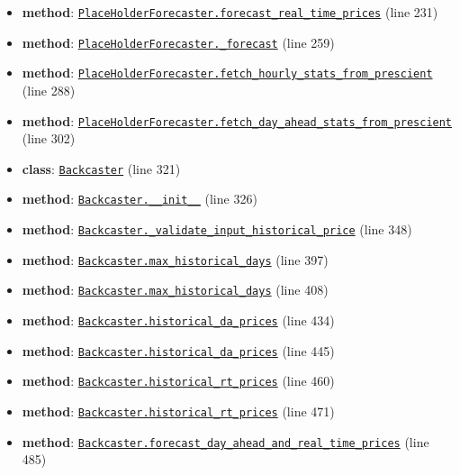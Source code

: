 \documentclass[11pt]{report}
\begin{document}
\begin{itemize}[leftmargin=*]
  \item \textbf{method}: \hyperref[def:forecaster.py:PlaceHolderForecaster.forecast_real_time_prices:L231]{\texttt{PlaceHolderForecaster.forecast\_real\_time\_prices}} (line 231)
  \item \textbf{method}: \hyperref[def:forecaster.py:PlaceHolderForecaster._forecast:L259]{\texttt{PlaceHolderForecaster.\_forecast}} (line 259)
  \item \textbf{method}: \hyperref[def:forecaster.py:PlaceHolderForecaster.fetch_hourly_stats_from_prescient:L288]{\texttt{PlaceHolderForecaster.fetch\_hourly\_stats\_from\_prescient}} (line 288)
  \item \textbf{method}: \hyperref[def:forecaster.py:PlaceHolderForecaster.fetch_day_ahead_stats_from_prescient:L302]{\texttt{PlaceHolderForecaster.fetch\_day\_ahead\_stats\_from\_prescient}} (line 302)
  \item \textbf{class}: \hyperref[def:forecaster.py:Backcaster:L321]{\texttt{Backcaster}} (line 321)
  \item \textbf{method}: \hyperref[def:forecaster.py:Backcaster.__init__:L326]{\texttt{Backcaster.\_\_init\_\_}} (line 326)
  \item \textbf{method}: \hyperref[def:forecaster.py:Backcaster._validate_input_historical_price:L348]{\texttt{Backcaster.\_validate\_input\_historical\_price}} (line 348)
  \item \textbf{method}: \hyperref[def:forecaster.py:Backcaster.max_historical_days:L397]{\texttt{Backcaster.max\_historical\_days}} (line 397)
  \item \textbf{method}: \hyperref[def:forecaster.py:Backcaster.max_historical_days:L408]{\texttt{Backcaster.max\_historical\_days}} (line 408)
  \item \textbf{method}: \hyperref[def:forecaster.py:Backcaster.historical_da_prices:L434]{\texttt{Backcaster.historical\_da\_prices}} (line 434)
  \item \textbf{method}: \hyperref[def:forecaster.py:Backcaster.historical_da_prices:L445]{\texttt{Backcaster.historical\_da\_prices}} (line 445)
  \item \textbf{method}: \hyperref[def:forecaster.py:Backcaster.historical_rt_prices:L460]{\texttt{Backcaster.historical\_rt\_prices}} (line 460)
  \item \textbf{method}: \hyperref[def:forecaster.py:Backcaster.historical_rt_prices:L471]{\texttt{Backcaster.historical\_rt\_prices}} (line 471)
  \item \textbf{method}: \hyperref[def:forecaster.py:Backcaster.forecast_day_ahead_and_real_time_prices:L485]{\texttt{Backcaster.forecast\_day\_ahead\_and\_real\_time\_prices}} (line 485)

\end{itemize}
\end{document}
